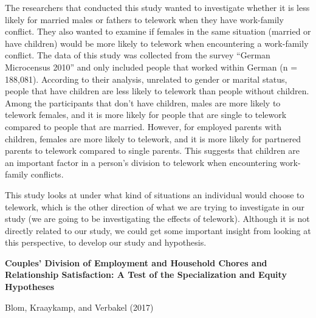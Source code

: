 \documentclass[
  english,
  man]{apa6}
\begin{document}
The researchers that conducted this study wanted to investigate whether it is less likely for married males or fathers to telework when they have work-family conflict. They also wanted to examine if females in the same situation (married or have children) would be more likely to telework when encountering a work-family conflict. The data of this study was collected from the survey ``German Microcensus 2010'' and only included people that worked within German (n = 188,081). According to their analysis, unrelated to gender or marital status, people that have children are less likely to telework than people without children. Among the participants that don't have children, males are more likely to telework females, and it is more likely for people that are single to telework compared to people that are married. However, for employed parents with children, females are more likely to telework, and it is more likely for partnered parents to telework compared to single parents. This suggests that children are an important factor in a person's division to telework when encountering work-family conflicts.

This study looks at under what kind of situations an individual would choose to telework, which is the other direction of what we are trying to investigate in our study (we are going to be investigating the effects of telework). Although it is not directly related to our study, we could get some important insight from looking at this perspective, to develop our study and hypothesis.

\textbf{Couples' Division of Employment and Household Chores and Relationship Satisfaction: A Test of the Specialization and Equity Hypotheses}

Blom, Kraaykamp, and Verbakel (2017)
\end{document}
